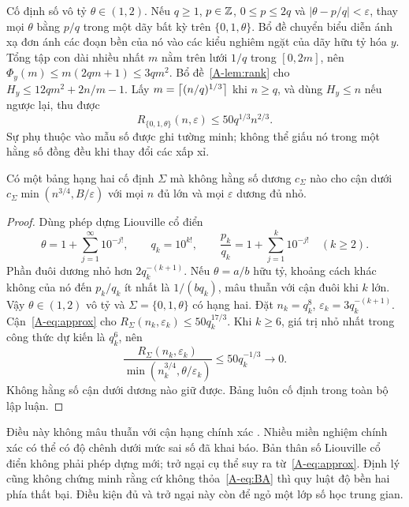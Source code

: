 Cố định số vô tỷ $\theta\in(1,2)$. Nếu $q\ge1$, $p\in\mathbb Z$, $0\le p\le2q$ và $|\theta-p/q|<\varepsilon$, thay mọi $\theta$ bằng $p/q$ trong một dãy bất kỳ trên $\{0,1,\theta\}$. Bổ đề chuyển biểu diễn ánh xạ đơn ánh các đoạn bền của nó vào các kiểu nghiêm ngặt của dãy hữu tỷ hóa $y$. Tổng tập con dài nhiều nhất $m$ nằm trên lưới $1/q$ trong $[0,2m]$, nên $\Phi_y(m)\le m(2qm+1)\le3qm^2$. Bổ đề~\ref{A-lem:rank} cho $H_y\le12qm^2+2n/m-1$. Lấy $m=\left\lceil (n/q)^{1/3}\right\rceil$ khi $n\ge q$, và dùng $H_y\le n$ nếu ngược lại, thu được
\begin{equation}\label{A-eq:approx}
R_{\{0,1,\theta\}}(n,\varepsilon)\le50q^{1/3}n^{2/3}.
\end{equation}
Sự phụ thuộc vào mẫu số được ghi tường minh; không thể giấu nó trong một hằng số đồng đều khi thay đổi các xấp xỉ.

\begin{theorem}\label{A-thm:obstruction}
Có một bảng hạng hai cố định $\Sigma$ mà không hằng số dương $c_\Sigma$ nào cho cận dưới $c_\Sigma\min(n^{3/4},B/\varepsilon)$ với mọi $n$ đủ lớn và mọi $\varepsilon$ dương đủ nhỏ.
\end{theorem}
\begin{proof}
Dùng phép dựng Liouville cổ điển
\begin{equation}\label{A-eq:liouville}
\theta=1+\sum_{j=1}^{\infty}10^{-j!},\qquad
q_k=10^{k!},\qquad \frac{p_k}{q_k}=1+\sum_{j=1}^k10^{-j!}\quad(k\ge2).
\end{equation}
Phần đuôi dương nhỏ hơn $2q_k^{-(k+1)}$. Nếu $\theta=a/b$ hữu tỷ, khoảng cách khác không của nó đến $p_k/q_k$ ít nhất là $1/(bq_k)$, mâu thuẫn với cận đuôi khi $k$ lớn. Vậy $\theta\in(1,2)$ vô tỷ và $\Sigma=\{0,1,\theta\}$ có hạng hai. Đặt $n_k=q_k^8$, $\varepsilon_k=3q_k^{-(k+1)}$. Cận~\eqref{A-eq:approx} cho $R_\Sigma(n_k,\varepsilon_k)\le50q_k^{17/3}$. Khi $k\ge6$, giá trị nhỏ nhất trong công thức dự kiến là $q_k^6$, nên
\begin{equation}\label{A-eq:obstruction}
\frac{R_\Sigma(n_k,\varepsilon_k)}{\min(n_k^{3/4},\theta/\varepsilon_k)}
\le50q_k^{-1/3}\longrightarrow0.
\end{equation}
Không hằng số cận dưới dương nào giữ được. Bảng luôn cố định trong toàn bộ lập luận.
\end{proof}
Điều này không mâu thuẫn với cận hạng chính xác . Nhiều miền nghiệm chính xác có thể có độ chênh dưới mức sai số đã khai báo. Bản thân số Liouville cổ điển không phải phép dựng mới; trở ngại cụ thể suy ra từ~\eqref{A-eq:approx}. Định lý cũng không chứng minh rằng cứ không thỏa~\eqref{A-eq:BA} thì quy luật độ bền hai phía thất bại. Điều kiện đủ và trở ngại này còn để ngỏ một lớp số học trung gian.

